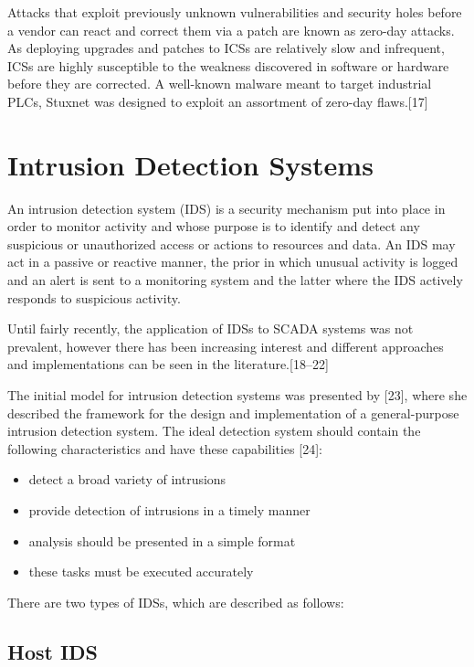 \documentclass[12pt,]{article}
\begin{document}
Attacks that exploit previously unknown vulnerabilities and security
holes before a vendor can react and correct them via a patch are known
as zero-day attacks. As deploying upgrades and patches to ICSs are
relatively slow and infrequent, ICSs are highly susceptible to the
weakness discovered in software or hardware before they are corrected. A
well-known malware meant to target industrial PLCs, Stuxnet was designed
to exploit an assortment of zero-day flaws.{[}17{]}

\pagebreak

\section{Intrusion Detection Systems}\label{intrusion-detection-systems}

An intrusion detection system (IDS) is a security mechanism put into
place in order to monitor activity and whose purpose is to identify and
detect any suspicious or unauthorized access or actions to resources and
data. An IDS may act in a passive or reactive manner, the prior in which
unusual activity is logged and an alert is sent to a monitoring system
and the latter where the IDS actively responds to suspicious activity.

Until fairly recently, the application of IDSs to SCADA systems was not
prevalent, however there has been increasing interest and different
approaches and implementations can be seen in the
literature.{[}18--22{]}

The initial model for intrusion detection systems was presented by
{[}23{]}, where she described the framework for the design and
implementation of a general-purpose intrusion detection system. The
ideal detection system should contain the following characteristics and
have these capabilities {[}24{]}:

\begin{itemize}
\itemsep1pt\parskip0pt
\item
  detect a broad variety of intrusions
\item
  provide detection of intrusions in a timely manner
\item
  analysis should be presented in a simple format
\item
  these tasks must be executed accurately
\end{itemize}

There are two types of IDSs, which are described as follows:

\subsection{Host IDS}\label{host-ids}
\end{document}
